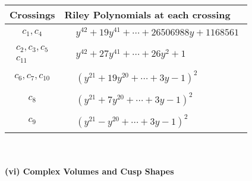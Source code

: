 \documentclass[1p]{elsarticle_modified}
\theoremstyle{definition}
\begin{document}
\begin{tabular}{m{50pt}|m{274pt}}
Crossings & \hspace{64pt}Riley Polynomials at each crossing \\
\hline $$\begin{aligned}c_{1},c_{4}\end{aligned}$$&$\begin{aligned}
&y^{42}+19 y^{41}+\cdots+26506988 y+1168561
\end{aligned}$\\
\hline $$\begin{aligned}c_{2},c_{3},c_{5}\\c_{11}\end{aligned}$$&$\begin{aligned}
&y^{42}+27 y^{41}+\cdots+26 y^2+1
\end{aligned}$\\
\hline $$\begin{aligned}c_{6},c_{7},c_{10}\end{aligned}$$&$\begin{aligned}
&(y^{21}+19 y^{20}+\cdots+3 y-1)^{2}
\end{aligned}$\\
\hline $$\begin{aligned}c_{8}\end{aligned}$$&$\begin{aligned}
&(y^{21}+7 y^{20}+\cdots+3 y-1)^{2}
\end{aligned}$\\
\hline $$\begin{aligned}c_{9}\end{aligned}$$&$\begin{aligned}
&(y^{21}- y^{20}+\cdots+3 y-1)^{2}
\end{aligned}$\\
\hline
\end{tabular}\\~\\
\newpage\flushleft \textbf{(vi) Complex Volumes and Cusp Shapes}
\end{document}
